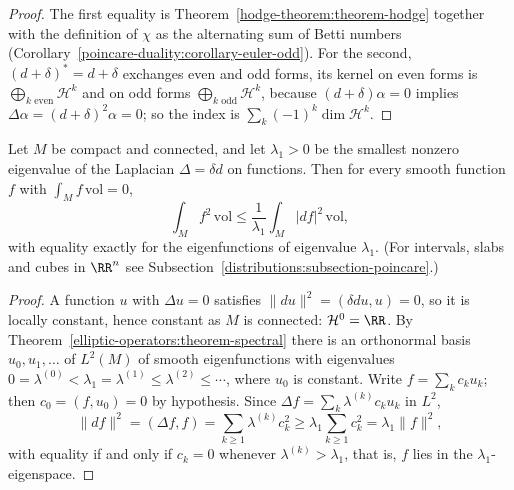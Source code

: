 \begin{proof}
The first equality is Theorem~\ref{hodge-theorem:theorem-hodge} together with the definition of $\chi$ as the alternating sum of Betti numbers
(Corollary~\ref{poincare-duality:corollary-euler-odd}). For the second, $(d + \delta)^* = d + \delta$ exchanges even and odd forms, its kernel on even forms is $\bigoplus_{k \text{ even}}\mathcal{H}^k$ and on odd
forms $\bigoplus_{k \text{ odd}}\mathcal{H}^k$, because $(d + \delta)\alpha = 0$ implies $\Delta\alpha = (d+\delta)^2\alpha = 0$; so the index is $\sum_k(-1)^k\dim\mathcal{H}^k$.
\end{proof}

\begin{corollary}\label{hodge-theorem:corollary-poincare-inequality}
Let $M$ be compact and connected, and let $\lambda_1 > 0$ be the smallest nonzero eigenvalue of the Laplacian $\Delta = \delta d$ on functions. Then for every smooth function $f$ with $\int_Mf\,\mathrm{vol} = 0$,
\[
\int_Mf^2\,\mathrm{vol} \leq \frac{1}{\lambda_1}\int_M|df|^2\,\mathrm{vol},
\]
with equality exactly for the eigenfunctions of eigenvalue $\lambda_1$. (For intervals, slabs and cubes in $\RR^n$ see Subsection~\ref{distributions:subsection-poincare}.)
\end{corollary}

\begin{proof}
A function $u$ with $\Delta u = 0$ satisfies $\|du\|^2 = (\delta du, u) = 0$, so it is locally constant, hence constant as $M$ is connected: $\mathcal{H}^0 = \RR$. By Theorem~\ref{elliptic-operators:theorem-spectral} there is an
orthonormal basis $u_0, u_1, \ldots$ of $L^2(M)$ of smooth eigenfunctions with eigenvalues $0 = \lambda^{(0)} < \lambda_1 = \lambda^{(1)} \leq \lambda^{(2)} \leq \cdots$, where $u_0$ is constant. Write
$f = \sum_kc_ku_k$; then $c_0 = (f, u_0) = 0$ by hypothesis. Since $\Delta f = \sum_k\lambda^{(k)}c_ku_k$ in $L^2$,
\[
\|df\|^2 = (\Delta f, f) = \sum_{k \geq 1}\lambda^{(k)}c_k^2 \geq \lambda_1\sum_{k \geq 1}c_k^2 = \lambda_1\|f\|^2,
\]
with equality if and only if $c_k = 0$ whenever $\lambda^{(k)} > \lambda_1$, that is, $f$ lies in the $\lambda_1$-eigenspace.
\end{proof}

